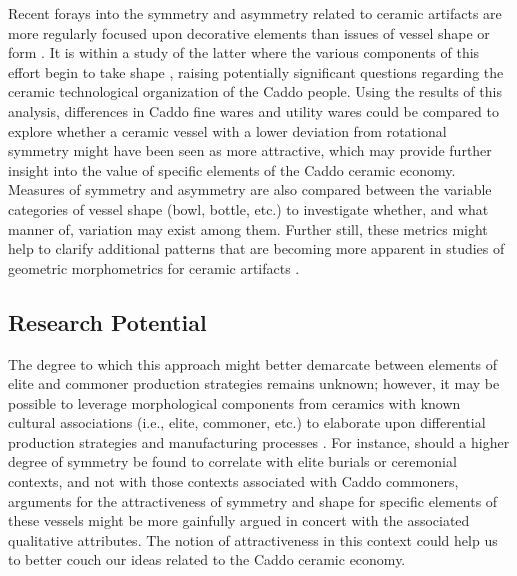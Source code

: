 \documentclass[preprint,12pt]{elsarticle}
\begin{document}
Recent forays into the symmetry and asymmetry related to ceramic artifacts are more regularly focused upon decorative elements \citep{Pluckhahn:1} than issues of vessel shape or form \citep{Girrulat:1}. It is within a study of the latter where the various components of this effort begin to take shape \citep{Hodgson:1}, raising potentially significant questions regarding the ceramic technological organization of the Caddo people. Using the results of this analysis, differences in Caddo fine wares and utility wares could be compared to explore whether a ceramic vessel with a lower deviation from rotational symmetry might have been seen as more attractive, which may provide further insight into the value of specific elements of the Caddo ceramic economy. Measures of symmetry and asymmetry are also compared between the variable categories of vessel shape (bowl, bottle, etc.) to investigate whether, and what manner of, variation may exist among them. Further still, these metrics might help to clarify additional patterns that are becoming more apparent in studies of geometric morphometrics for ceramic artifacts \citep{Selden:2}.

\subsection{Research Potential} 

The degree to which this approach might better demarcate between elements of elite and commoner production strategies \citep{Inomata:1} remains unknown; however, it may be possible to leverage morphological components from ceramics with known cultural associations (i.e., elite, commoner, etc.) to elaborate upon differential production strategies and manufacturing processes \citep{Wang:1}. For instance, should a higher degree of symmetry be found to correlate with elite burials or ceremonial contexts, and not with those contexts associated with Caddo commoners, arguments for the attractiveness of symmetry \cite{Little:1, Little:2, Little:3} and shape \cite{Shott:2, Shott:3, Shott:4, Slice:1} for specific elements of these vessels might be more gainfully argued in concert with the associated qualitative attributes. The notion of attractiveness in this context could help us to better couch our ideas related to the Caddo ceramic economy.
\end{document}
